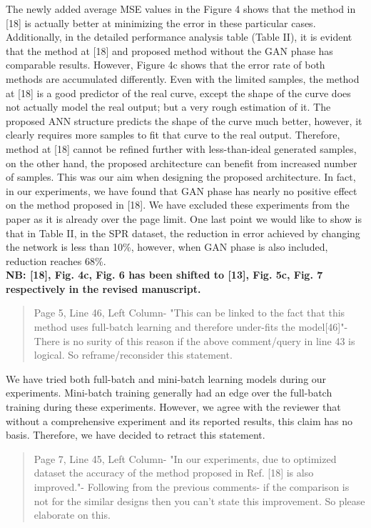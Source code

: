 \documentclass{article}
\begin{document}
	The newly added average MSE values in the Figure 4 shows that the method in [18] is actually better at minimizing the error in these particular cases. Additionally, in the detailed performance analysis table (Table II), it is evident that the method at [18] and proposed method without the GAN phase has comparable results. However, Figure 4c shows that the error rate of both methods are accumulated differently. Even with the limited samples, the method at [18] is a good predictor of the real curve, except the shape of the curve does not actually model the real output; but a very rough estimation of it. The proposed ANN structure predicts the shape of the curve much better, however, it clearly requires more samples to fit that curve to the real output. Therefore, method at [18] cannot be refined further with less-than-ideal generated samples, on the other hand, the proposed architecture can benefit from increased number of samples. This was our aim when designing the proposed architecture. In fact, in our experiments, we have found that GAN phase has nearly no positive effect on the method proposed in [18]. We have excluded these experiments from the paper as it is already over the page limit. One last point we would like to show is that in Table II, in the SPR dataset, the reduction in error achieved by changing the network is less than 10\%, however, when GAN phase is also included, reduction reaches 68\%. \\
	
	\textbf{NB: [18], Fig. 4c, Fig. 6 has been shifted to [13], Fig. 5c, Fig. 7 respectively in the revised manuscript.}
	
	\begin{quote}
	Page 5, Line 46, Left Column- "This can be linked to the fact that this method uses full-batch learning and therefore under-fits the model[46]"- There is no surity of this reason if the above comment/query in line 43 is logical. So reframe/reconsider this statement.
	\end{quote}
	
	We have tried both full-batch and mini-batch learning models during our experiments. Mini-batch training generally had an edge over the full-batch training during these experiments. However, we agree with the reviewer that without a comprehensive experiment and its reported results, this claim has no basis. Therefore, we have decided to retract this statement.
	
	\begin{quote}
	Page 7, Line 45, Left Column- "In our experiments, due to optimized dataset the accuracy of the method proposed in Ref. [18] is also improved."- Following from the previous comments- if the comparison is not for the similar designs then you can't state this improvement. So please elaborate on this.
	\end{quote}
	
\end{document}
